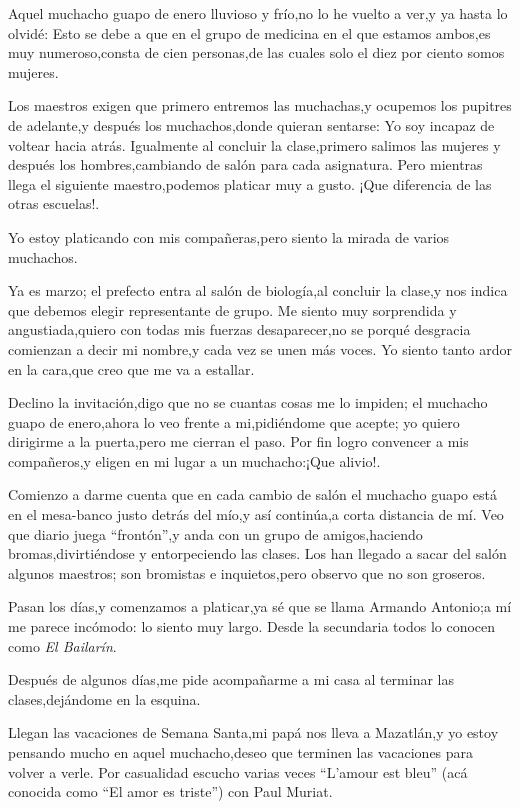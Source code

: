 \documentclass[letterpaper,12pt]{book}
\begin{document}
Aquel muchacho guapo de enero lluvioso y frío,no lo he vuelto a ver,y ya hasta lo olvidé: Esto se debe a que en el grupo de medicina en el que estamos ambos,es muy numeroso,consta de cien personas,de las cuales solo el diez por ciento somos mujeres.

Los maestros exigen que primero entremos las muchachas,y ocupemos los pupitres de adelante,y después los muchachos,donde quieran sentarse: Yo soy incapaz de voltear hacia atrás. Igualmente al concluir la clase,primero salimos las mujeres y después los hombres,cambiando de salón para cada asignatura. Pero mientras llega el siguiente maestro,podemos platicar muy a gusto. ¡Que diferencia de las otras escuelas!. 

Yo estoy platicando con mis compañeras,pero siento la mirada de varios muchachos.

Ya es marzo; el prefecto entra al salón de biología,al concluir la clase,y nos indica que debemos elegir representante de grupo. Me siento muy sorprendida y angustiada,quiero con todas mis fuerzas desaparecer,no se porqué desgracia comienzan a decir mi nombre,y cada vez se unen más voces. Yo siento tanto ardor en la cara,que creo que me va a estallar.

Declino la invitación,digo que no se cuantas cosas me lo impiden; el muchacho guapo de enero,ahora lo veo frente a mi,pidiéndome que acepte; yo quiero dirigirme a la puerta,pero me cierran el paso. Por fin logro convencer a mis compañeros,y eligen en mi lugar a un muchacho:¡Que alivio!.

Comienzo a darme cuenta que en cada cambio de salón el muchacho guapo está en el mesa-banco justo detrás del mío,y así continúa,a corta distancia de mí. Veo que diario juega ``frontón'',y anda con un grupo de amigos,haciendo bromas,divirtiéndose y entorpeciendo las clases. Los han llegado a sacar del salón algunos maestros; son bromistas e inquietos,pero observo que no son groseros.

Pasan los días,y comenzamos a platicar,ya sé que se llama Armando Antonio;a mí me parece incómodo: lo siento muy largo. Desde la secundaria todos lo conocen como \textit{El Bailarín}.

Después de algunos días,me pide acompañarme a mi casa al terminar las clases,dejándome en la esquina. 

Llegan las vacaciones de Semana Santa,mi papá nos lleva a Mazatlán,y yo estoy pensando mucho en aquel muchacho,deseo que terminen las vacaciones para volver a verle. Por casualidad escucho varias veces ``L'amour est bleu'' (acá conocida como ``El amor es triste'') con Paul Muriat. 
\end{document}
